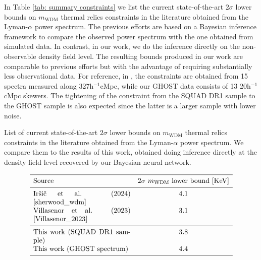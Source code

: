 In Table \ref{tab: summary constraints} we list the current state-of-the-art $2\sigma$ lower bounds on $m_{\mathrm{WDM}}$ thermal relics constraints in the literature obtained from the Lyman-$\alpha$ power spectrum. The previous efforts are based on a Bayesian inference framework to compare the observed power spectrum with the one obtained from simulated data. In contrast, in our work, we do the inference directly on the non-observable density field level. The resulting bounds produced in our work are comparable to previous efforts but with the advantage of requiring substantially less observational data. For reference, in \cite{sherwood_wdm}, the constraints are obtained from 15 spectra measured along 327h$^{-1}$cMpc,  while our GHOST data consists of 13  20h$^{-1}$cMpc skewers. The tightening of the constraint from the SQUAD DR1 sample to the GHOST sample is also expected since the latter is a larger sample with lower noise.
\begin{table}[h!]
    \caption[]{List of  current state-of-the-art $2\sigma$ lower bounds on $m_{\mathrm{WDM}}$ thermal relics constraints in the literature obtained from the Lyman-$\alpha$ power spectrum. We compare them to the results of this work, obtained doing inference directly at the density field level recovered by our Bayesian neural network. }
       \label{tab: summary constraints}
   $$ 
       \begin{array}{p{0.4\textwidth}c}
          \hline
          \noalign{\smallskip}
          Source &  2\sigma\ m_{\mathrm{WDM}} \mathrm{{\ lower \ bound\ [KeV]}}  \\ 
          \noalign{\smallskip}
          \hline
          \noalign{\smallskip}
          Ir\v{s}i\v{c} et al. (2024) \cite{sherwood_wdm} & 4.1      \\
          Villasenor et al. (2023) \cite{Villasenor_2023} & 3.1      \\
          \noalign{\smallskip}
          \hline
          \noalign{\smallskip}
          This work (SQUAD DR1 sample)  & 3.8   \\
          This work (GHOST spectrum)  & 4.4        \\

          \noalign{\smallskip}
          \hline
       \end{array}
   $$ 
 \end{table}















